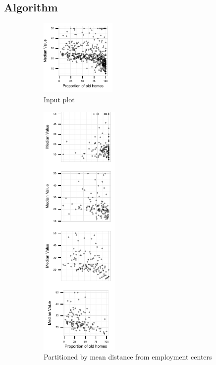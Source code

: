 \subsection{Algorithm}

\begin{figure}
 \centering 
    \begin{subfigure}[t]{1.45in}
        \includegraphics[width=1.45in]{images/AGE-MEDV.pdf}
        \caption{Input plot}
        \label{fig:method_original}
    \end{subfigure}
    \begin{subfigure}[t]{1.5in}
  	\includegraphics[width=1.5in]{images/DIS.pdf}
	\caption{Partitioned by mean distance from employment centers}
	 \label{fig:method_actual}
    \end{subfigure}
    \begin{subfigure}[t]{1.5in}

\end{subfigure}
\end{figure}
